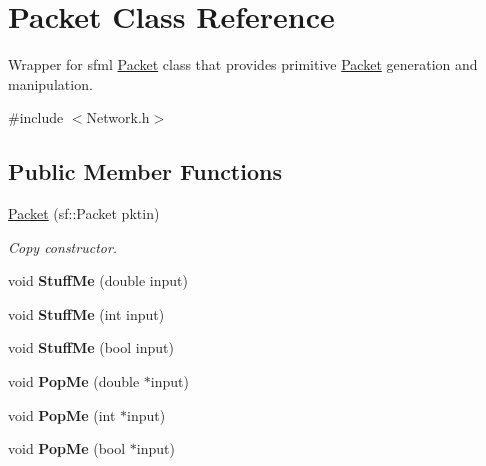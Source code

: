 \hypertarget{class_packet}{}\section{Packet Class Reference}
\label{class_packet}


Wrapper for sfml \hyperlink{class_packet}{Packet} class that provides primitive \hyperlink{class_packet}{Packet} generation and manipulation.  




{\ttfamily \#include $<$Network.\+h$>$}

\subsection*{Public Member Functions}
\begin{DoxyCompactItemize}
\item 
\hypertarget{class_packet_a8b4c1dd3fec14925e88df2b0f3fdfa28}{}\label{class_packet_a8b4c1dd3fec14925e88df2b0f3fdfa28} 
\hyperlink{class_packet_a8b4c1dd3fec14925e88df2b0f3fdfa28}{Packet} (sf\+::\+Packet pktin)
\begin{DoxyCompactList}\small\item\em Copy constructor. \end{DoxyCompactList}\item 
\hypertarget{class_packet_ad9268e17dd1ec9c3ed5ba8630dd6a5d0}{}\label{class_packet_ad9268e17dd1ec9c3ed5ba8630dd6a5d0} 
void {\bfseries Stuff\+Me} (double input)
\item 
\hypertarget{class_packet_a16415c06803e885529f1f7fba7455dc3}{}\label{class_packet_a16415c06803e885529f1f7fba7455dc3} 
void {\bfseries Stuff\+Me} (int input)
\item 
\hypertarget{class_packet_a0828dded7d7aae907bff02a897e2d0b8}{}\label{class_packet_a0828dded7d7aae907bff02a897e2d0b8} 
void {\bfseries Stuff\+Me} (bool input)
\item 
\hypertarget{class_packet_af9dd66e7668001601b01e024b3909c26}{}\label{class_packet_af9dd66e7668001601b01e024b3909c26} 
void {\bfseries Pop\+Me} (double $\ast$input)
\item 
\hypertarget{class_packet_a870a5bc6e8efb188459d474360a7b6bd}{}\label{class_packet_a870a5bc6e8efb188459d474360a7b6bd} 
void {\bfseries Pop\+Me} (int $\ast$input)
\item 
\hypertarget{class_packet_a48e1b1bbb9a3a31f730136a13c4c7f73}{}\label{class_packet_a48e1b1bbb9a3a31f730136a13c4c7f73} 
void {\bfseries Pop\+Me} (bool $\ast$input)
\end{DoxyCompactItemize}
